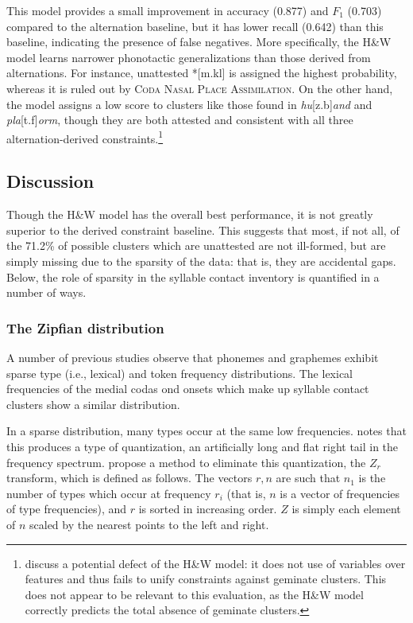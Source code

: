 This model provides a small improvement in accuracy (0.877) and $F_1$ (0.703) compared to the alternation baseline, but it has lower recall (0.642) than this baseline, indicating the presence of false negatives. More specifically, the H\&W model learns narrower phonotactic generalizations than those derived from alternations. For instance, unattested *[m.kl] is assigned the highest probability, whereas it is ruled out by \textsc{Coda Nasal Place Assimilation}. On the other hand, the \citeauthor{Hayes2008a} model assigns a low score to clusters like those found in \emph{hu}[z.b]\emph{and} and \emph{pla}[t.f]\emph{orm}, though they are both attested and consistent with all three alternation-derived constraints.\footnote{\citet{Berent2012} discuss a potential defect of the H\&W model: it does not use of variables over features and thus fails to unify constraints against geminate clusters. This does not appear to be relevant to this evaluation, as the H\&W model correctly predicts the total absence of geminate clusters.}

\subsection{Discussion}

Though the H\&W model has the overall best performance, it is not greatly superior to the derived constraint baseline. This suggests that most, if not all, of the 71.2\% of possible clusters which are unattested are not ill-formed, but are simply missing due to the sparsity of the data: that is, they are accidental gaps. Below, the role of sparsity in the syllable contact inventory is quantified in a number of ways. 

\subsubsection{The Zipfian distribution}

A number of previous studies \citep[e.g.,][]{Sigurd1968,Good1969,Borodovsky1989,Witten1990,Martindale1996,Tambovtsev2007} observe that phonemes and graphemes exhibit sparse type (i.e., lexical) and token frequency distributions. The lexical frequencies of the medial codas ond onsets which make up syllable contact clusters show a similar distribution. 

In a sparse distribution, many types occur at the same low frequencies. \citet{Good1953} notes that this produces a type of quantization, an artificially long and flat right tail in the frequency spectrum. \citet[][29]{Church1991} propose a method to eliminate this quantization, the $Z_r$ transform, which is defined as follows. The vectors $r, n$ are such that $n_1$ is the number of types which occur at frequency $r_i$ (that is, $n$ is a vector of frequencies of type frequencies), and $r$ is sorted in increasing order. $Z$ is simply each element of $n$ scaled by the nearest points to the left and right. 

